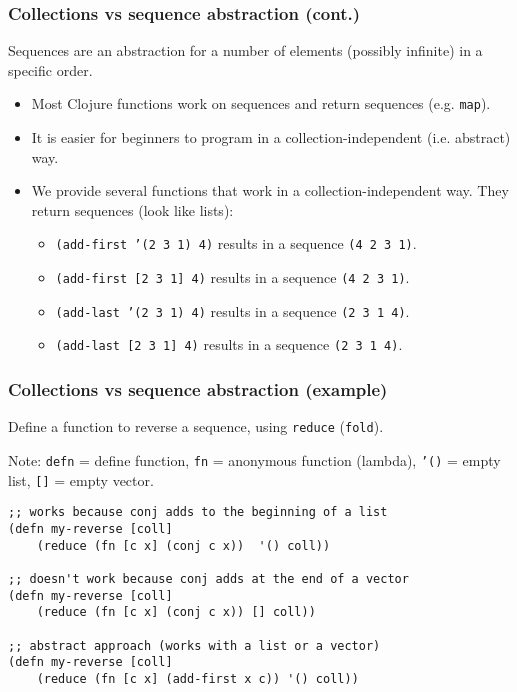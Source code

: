\documentclass{beamer}
\newcommand{\allcomments}[1]{{#1}}
\newcommand{\joecomment}[1]{{\bf \color{JoesGold}{\allcomments{{#1}}}}}
\newcommand{\elenacomment}[1]{{\bf \textcolor{ForestGreen}{\allcomments{{#1}}}}}
\begin{document}
\begin{frame}
\frametitle{Collections vs sequence abstraction (cont.)}
Sequences are an abstraction for a number of elements (possibly infinite) in a specific order. 
\begin{itemize}
\item Most Clojure functions work on sequences and return sequences (e.g. {\tt map}). 
\item It is easier for beginners to program in a collection-independent (i.e. abstract) way.
\item We provide several functions that work in a collection-independent way. They return sequences (look like lists):
\begin{itemize}
\item {\tt (add-first '(2 3 1) 4)} results in a sequence {\tt (4 2 3 1)}.
\item {\tt (add-first [2 3 1] 4)} results in a sequence {\tt (4 2 3 1)}.
\item {\tt (add-last '(2 3 1) 4)} results in a sequence {\tt (2 3 1 4)}.
\item {\tt (add-last [2 3 1] 4)} results in a sequence {\tt (2 3 1 4)}.
\end{itemize}
\end{itemize}
\end{frame}

\begin{frame}[fragile]
\frametitle{Collections vs sequence abstraction (example)}
Define a function to reverse a sequence, using {\tt reduce}  ({\tt fold}). 

Note: {\tt defn} = define function, {\tt fn} = anonymous function (lambda),  {\tt '()} = empty list, {\tt []} = empty vector.  %
\begin{verbatim}
;; works because conj adds to the beginning of a list
(defn my-reverse [coll]
    (reduce (fn [c x] (conj c x))  '() coll)) 

;; doesn't work because conj adds at the end of a vector
(defn my-reverse [coll]
    (reduce (fn [c x] (conj c x)) [] coll)) 

;; abstract approach (works with a list or a vector)
(defn my-reverse [coll]
    (reduce (fn [c x] (add-first x c)) '() coll)) 
\end{verbatim} %
\end{frame}
\end{document}
